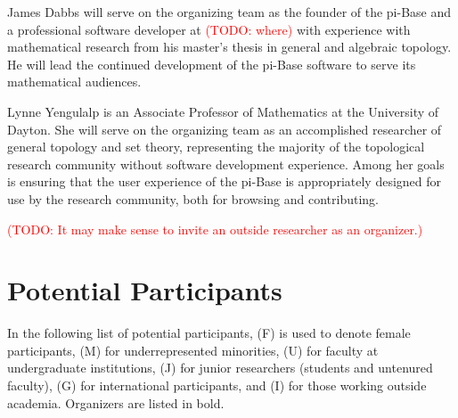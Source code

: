 \documentclass{amsart}
\newcommand{\TODO}[1]{\textcolor{red}{(TODO: #1)}}
\begin{document}
James Dabbs will serve on the organizing team as the founder of the pi-Base
and a professional software developer at \TODO{where} 
with experience with mathematical
research from his master's thesis in general and algebraic topology.
He will lead the continued development of the pi-Base software to
serve its mathematical audiences.

Lynne Yengulalp is an Associate Professor of Mathematics at the
University of Dayton. She will serve on the organizing team as an accomplished researcher
of general topology and set theory, representing the majority of
the topological research community without software development experience.
Among her goals is ensuring
that the user experience of the pi-Base is appropriately designed for
use by the research community, both for browsing and contributing.

\TODO{It may make sense to invite an outside researcher as an organizer.}

\section{Potential Participants}

In the following list of potential participants, (F) is used to denote
female participants, (M) for underrepresented minorities, (U) for
faculty at undergraduate institutions, (J) for junior researchers
(students and untenured faculty), (G) for international participants, 
and (I) for those working
outside academia. Organizers are listed in bold.
\end{document}
